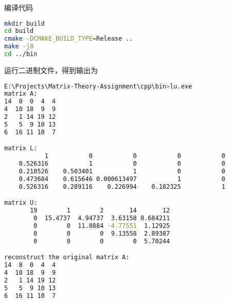 编译代码
\begin{lstlisting}[language=bash]
mkdir build
cd build
cmake -DCMAKE_BUILD_TYPE=Release ..
make -j8
cd ../bin
\end{lstlisting}
运行二进制文件，得到输出为
\begin{lstlisting}[language=bash]
E:\Projects\Matrix-Theory-Assignment\cpp\bin>lu.exe
matrix A:
14  8  0  4  4
4  10 18  9  9
2   1 14 19 12
5   5  9 10 13
6  16 11 10  7

matrix L:
           1           0           0           0           0
    0.526316           1           0           0           0
    0.210526    0.503401           1           0           0
    0.473684    0.615646 0.000613497           1           0
    0.526316    0.289116    0.226994    0.182325           1

matrix U:
       19        1        2       14       12
        0  15.4737  4.94737  3.63158 0.684211
        0        0  11.0884 -4.77551  1.12925
        0        0        0  9.13558  2.89387
        0        0        0        0  5.70244

reconstruct the original matrix A:
14  8  0  4  4
4  10 18  9  9
2   1 14 19 12
5   5  9 10 13
6  16 11 10  7
\end{lstlisting}
